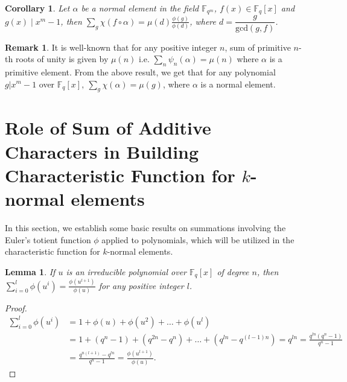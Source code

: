 \documentclass[12pt,a4paper]{article}
\theoremstyle{plain}
\newtheorem{cor}[thm]{Corollary}
\newtheorem{lem}[thm]{Lemma}
\theoremstyle{definition}
\newtheorem{rem}[defn]{Remark}
\numberwithin{equation}{section}
\begin{document}
    \begin{cor}
        Let $\alpha$ be a normal element in the field $\mathbb{F}_{q^m}$, $f(x) \in \mathbb{F}_q[x]$ and $g(x) \mid x^m-1$, then $\displaystyle \sum_g \chi(f\circ \alpha) = \mu(d) \frac{\phi(g)}{\phi(d)}$, where $d=\dfrac{g}{\text{gcd}(g,f)}$.
    \end{cor}
    \begin{rem}
        It is well-known that for any positive integer $n$, sum of primitive $n$-th roots of unity is given by $\mu(n)$ i.e. $\displaystyle\sum_n \psi_n(\alpha) = \mu\left( n \right) $ where $\alpha$ is a primitive element.  From the above result, we get that for any polynomial $g\vert x^m-1$ over  $\mathbb{F}_q[x],~  \displaystyle \sum_g \chi(\alpha)=\mu(g)$, where $\alpha$ is a normal element.
    \end{rem}

    \section{Role of Sum of Additive Characters in Building Characteristic Function for $k$-normal elements}
    In this section, we establish some basic results on summations involving the Euler's totient function $\phi$ applied to polynomials, which will be utilized in the characteristic function for $k$-normal elements.

    \begin{lem}\label{Lemmasumphi}
         If $u$ is an irreducible polynomial over $\mathbb{F}_q[x]$ of degree $n$, then $\displaystyle \sum_{i=0}^l\phi(u^i) = \frac{\phi(u^{l+1})}{\phi(u)}$ for any positive integer $l$.
     \end{lem}
     \begin{proof}
         \begin{align*}
             \displaystyle \sum_{i=0}^l\phi(u^i) &= 1+\phi(u)+\phi(u^2)+\dots +\phi(u^{l})\\
             &=1+(q^n-1)+(q^{2n}-q^n)+\dots+(q^{ln}-q^{(l-1)n}) = q^{ln} = \frac{q^{ln}(q^n-1)}{q^n-1} \\
             &= \frac{q^{n(l+1)}-q^{ln}}{q^n-1} = \frac{\phi(u^{l+1})}{\phi(u)}.
         \end{align*}
     \end{proof}
\end{document}
